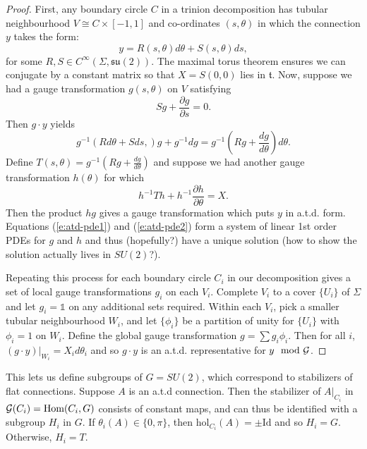 	\begin{proof}
	First, any boundary circle $C$ in a trinion decomposition has tubular neighbourhood $V\cong C\times [-1,1]$ and co-ordinates $(s,\theta)$ in which the connection $y$ takes the form:
	\begin{equation}
		y = R(s,\theta)d\theta + S(s,\theta)ds,
	\end{equation}
	for some $R,S \in C^\infty(\Sigma, \mathfrak{su}(2))$. The maximal torus theorem ensures we can conjugate by a constant matrix so that $X=S(0,0)$ lies in $\mathfrak{t}$. Now, suppose we had a gauge transformation $g(s,\theta)$ on $V$ satisfying
	\begin{equation}
		\label{e:atd-pde1}
		Sg + \frac{\partial g}{\partial s} = 0.
	\end{equation}
	Then $g\cdot y$ yields
	\begin{equation}
		g^{-1}\left(Rd\theta + Sds,\right)g + g^{-1}dg = g^{-1}\left(Rg + \frac{dg}{d\theta}\right)d\theta.
	\end{equation}
	Define $T(s,\theta) = g^{-1}\left(Rg + \frac{dg}{d\theta}\right)$ and suppose we had another gauge transformation $h(\theta)$ for which
	\begin{equation}
		\label{e:atd-pde2}
		h^{-1}Th + h^{-1}\frac{\partial h}{\partial \theta} = X.
	\end{equation}
	Then the product $hg$ gives a gauge transformation which puts $y$ in a.t.d. form. Equations (\ref{e:atd-pde1}) and (\ref{e:atd-pde2}) form a system of linear 1st order PDEs for $g$ and $h$ and thus (hopefully?) have a unique solution (how to show the solution actually lives in $SU(2)$?).
	
	Repeating this process for each boundary circle $C_i$ in our decomposition gives a set of local gauge transformations $g_i$ on each $V_i$. Complete $V_i$ to a cover $\{U_i\}$ of $\Sigma$ and let $g_i = \mathds{1}$ on any additional sets required. Within each $V_i$, pick a smaller tubular neighbourhood $W_i$, and let $\{\phi_i\}$ be a partition of unity for $\{U_i\}$ with $\phi_i = 1$ on $W_i$. Define the global gauge transformation $g = \sum g_i \phi_i$. Then for all $i$, $(g\cdot y)|_{W_i} = X_i d\theta_i$ and so $g\cdot y$ is an a.t.d. representative for $y \mod {\mathcal{G}}$.
	\end{proof}
	
	This lets us define subgroups of $G=SU(2)$, which correspond to stabilizers of flat connections. Suppose $A$ is an a.t.d connection. Then the stabilizer of $A|_{C_i}$ in $\mathcal{G}(C_i) = \text{Hom}(C_i, G)$ consists of constant maps, and can thus be identified with a subgroup $H_i$ in $G$. If $\theta_i(A) \in \{0,\pi\}$, then $\text{hol}_{C_i}(A) = \pm\text{Id}$ and so $H_i = G$. Otherwise, $H_i = T$. 
	
